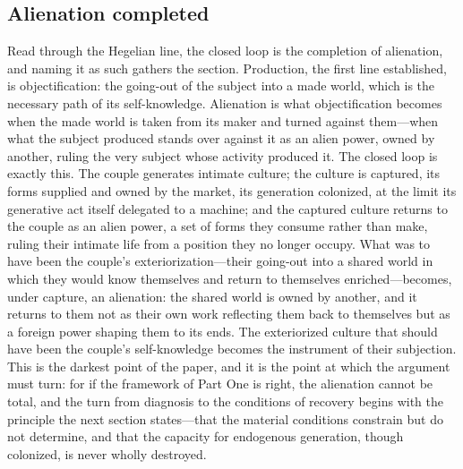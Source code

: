 \subsection*{Alienation completed}

Read through the Hegelian line, the closed loop is the completion of alienation, and naming it as such gathers the section. Production, the first line established, is objectification: the going-out of the subject into a made world, which is the necessary path of its self-knowledge. Alienation is what objectification becomes when the made world is taken from its maker and turned against them---when what the subject produced stands over against it as an alien power, owned by another, ruling the very subject whose activity produced it. The closed loop is exactly this. The couple generates intimate culture; the culture is captured, its forms supplied and owned by the market, its generation colonized, at the limit its generative act itself delegated to a machine; and the captured culture returns to the couple as an alien power, a set of forms they consume rather than make, ruling their intimate life from a position they no longer occupy. What was to have been the couple's exteriorization---their going-out into a shared world in which they would know themselves and return to themselves enriched---becomes, under capture, an alienation: the shared world is owned by another, and it returns to them not as their own work reflecting them back to themselves but as a foreign power shaping them to its ends. The exteriorized culture that should have been the couple's self-knowledge becomes the instrument of their subjection. This is the darkest point of the paper, and it is the point at which the argument must turn: for if the framework of Part One is right, the alienation cannot be total, and the turn from diagnosis to the conditions of recovery begins with the principle the next section states---that the material conditions constrain but do not determine, and that the capacity for endogenous generation, though colonized, is never wholly destroyed.
